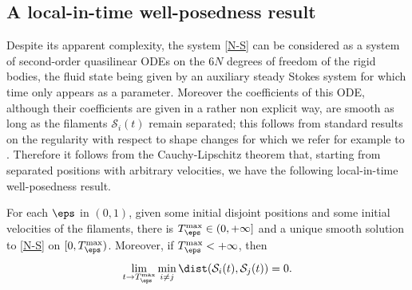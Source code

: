 \subsection{A local-in-time well-posedness result}
Despite its apparent complexity, the system \eqref{N-S} can be considered as a system of second-order quasilinear ODEs on the $6N$ degrees of freedom of the rigid bodies, the fluid state being
given by an auxiliary steady Stokes system for which time only appears as a parameter.
Moreover the coefficients of this ODE, although
their coefficients are given in a rather non explicit way,
are smooth as long as the filaments $\mathcal S_i (t)$ remain separated; this follows from standard results on the regularity with respect to shape changes for which we refer for example to \cite{simon,BNDRDM1,BNDRDM2}.
Therefore it
follows from the Cauchy-Lipschitz theorem that,
starting from separated positions with arbitrary velocities,
we have
the following local-in-time well-posedness result.
\begin{Proposition} \label{CL}
For each $\eps$ in $(0,1)$,
given some initial disjoint positions and some initial velocities of the filaments,
there is $T^{\max}_\eps \in (0,+\infty]$ and a unique smooth solution to \eqref{N-S} on $[0,T^{\max}_\eps)$. Moreover, if $ T^{\max}_\eps
<+\infty$, then
\begin{equation} \label{explo}
\lim_{t \to T_\eps^{\max}} \min_{i \neq j} \dist(\mathcal S_i(t),\mathcal S_j(t)) = 0.
\end{equation}
\end{Proposition}
